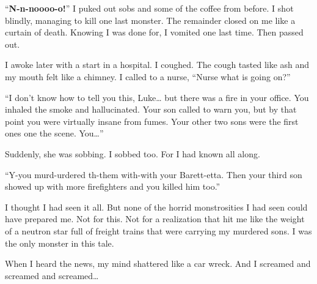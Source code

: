 ``{\bf N-n-noooo-o!}'' I puked out sobs and some of the coffee from
before. I shot blindly, managing to kill one last monster. The remainder
closed on me like a curtain of death. Knowing I was done for, I vomited
one last time. Then passed out.



I awoke later with a start in a hospital. I coughed. The cough
tasted like ash and my mouth felt like a chimney. I called to a
nurse, ``Nurse what is going on?''



``I don't know how to tell you this, Luke{\ldots} but
there was a fire in your office. You inhaled the smoke and
hallucinated. Your son called to warn you, but by that point you
were virtually insane from fumes. Your other two sons were the
first ones one the scene. You{\ldots}''



Suddenly, she was sobbing. I sobbed too. For I had known all
along.



``Y-you murd-urdered th-them with-with your Barett-etta. Then
your third son showed up with more firefighters and you killed him
too.''



I thought I had seen it all. But none of the horrid monstrosities I
had seen could have prepared me. Not for this. Not for a
realization that hit me like the weight of a neutron star full of
freight trains that were carrying my murdered sons. I was the only
monster in this tale.



When I heard the news, my mind shattered like a car wreck. And I
screamed and screamed and screamed{\ldots}


 






